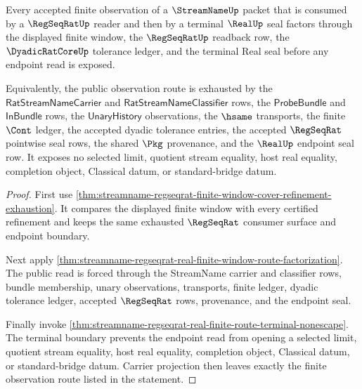\begin{theorem}
\label{thm:streamname-finite-window-observation-factorization}
Every accepted finite observation of a $\StreamNameUp$ packet that is consumed
by a $\RegSeqRatUp$ reader and then by a terminal $\RealUp$ seal factors through
the displayed finite window, the $\RegSeqRatUp$ readback row, the
$\DyadicRatCoreUp$ tolerance ledger, and the terminal Real seal before any
endpoint read is exposed.

Equivalently, the public observation route is exhausted by the
$\mathsf{RatStreamNameCarrier}$ and $\mathsf{RatStreamNameClassifier}$ rows,
the $\mathsf{ProbeBundle}$ and $\mathsf{InBundle}$ rows, the
$\mathsf{UnaryHistory}$ observations, the $\hsame$ transports, the finite
$\Cont$ ledger, the accepted dyadic tolerance entries, the accepted
$\RegSeqRat$ pointwise seal rows, the shared $\Pkg$ provenance, and the
$\RealUp$ endpoint seal row. It exposes no selected limit, quotient stream
equality, host real equality, completion object, Classical datum, or
standard-bridge datum.
\end{theorem}
\begin{proof}
First use
\autoref{thm:streamname-regseqrat-finite-window-cover-refinement-exhaustion}.
It compares the displayed finite window with every certified refinement and
keeps the same exhausted $\RegSeqRat$ consumer surface and endpoint boundary.

Next apply
\autoref{thm:streamname-regseqrat-real-finite-window-route-factorization}. The
public read is forced through the StreamName carrier and classifier rows,
bundle membership, unary observations, transports, finite ledger, dyadic
tolerance ledger, accepted $\RegSeqRat$ rows, provenance, and the endpoint
seal.

Finally invoke
\autoref{thm:streamname-regseqrat-real-finite-route-terminal-nonescape}. The
terminal boundary prevents the endpoint read from opening a selected limit,
quotient stream equality, host real equality, completion object, Classical
datum, or standard-bridge datum. Carrier projection then leaves exactly the
finite observation route listed in the statement.
\end{proof}
